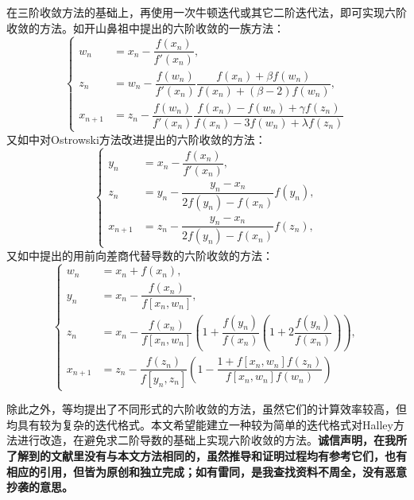 在三阶收敛方法的基础上，再使用一次牛顿迭代或其它二阶迭代法，即可实现六阶收敛的方法。如开山鼻祖\cite{neta1979sixth}中提出的六阶收敛的一族方法：
\begin{equation}
    \begin{cases}
        w_n &= x_n - \dfrac{f(x_n)}{f'(x_n)}, \\
        z_n &= w_n - \dfrac{f(w_n)}{f'(x_n)}\dfrac{f(x_n)+\beta f(w_n)}{f(x_n) + (\beta - 2)f(w_n)}, \\
        x_{n+1} &= z_n - \dfrac{f(w_n)}{f'(x_n)}\dfrac{f(x_n)-f(w_n)+\gamma f(z_n)}{f(x_n) - 3f(w_n) + \lambda f(z_n)}
    \end{cases}
\end{equation}
又如\cite{grau2006improvement}中对Ostrowski方法\cite{householder1967solution}改进提出的六阶收敛的方法：
\begin{equation}
    \begin{cases}
        y_n &= x_n - \dfrac{f(x_n)}{f'(x_n)}, \\
        z_n &= y_n - \dfrac{y_n - x_n}{2f(y_n) - f(x_n)}f(y_n), \\
        x_{n+1} &= z_n - \dfrac{y_n - x_n}{2f(y_n) - f(x_n)}f(z_n),
    \end{cases}
\end{equation}
又如\cite{soleymani2011new}中提出的用前向差商代替导数的六阶收敛的方法：
\begin{equation}
    \begin{cases}
        w_n &= x_n + f(x_n), \\
        y_n &= x_n - \dfrac{f(x_n)}{f[x_n, w_n]}, \\
        z_n &= x_n - \dfrac{f(x_n)}{f[x_n, w_n]}\left( 1 + \dfrac{f(y_n)}{f(x_n)} \left( 1 + 2\dfrac{f(y_n)}{f(x_n)} \right) \right), \\
        x_{n+1} &= z_n - \dfrac{f(z_n)}{f[y_n, z_n]}\left( 1 - \dfrac{1+f[x_n,w_n]f(z_n)}{f[x_n, w_n]f(w_n)} \right)
    \end{cases}
\end{equation}

除此之外，\cite{chun2012new}\cite{solaiman2019two}\cite{narang2016new}等均提出了不同形式的六阶收敛的方法，虽然它们的计算效率较高，但均具有较为复杂的迭代格式。本文希望能建立一种较为简单的迭代格式对Halley方法进行改造，在避免求二阶导数的基础上实现六阶收敛的方法。\textbf{诚信声明，在我所了解到的文献里没有与本文方法相同的，虽然推导和证明过程均有参考它们，也有相应的引用，但皆为原创和独立完成；如有雷同，是我查找资料不周全，没有恶意抄袭的意思。}

